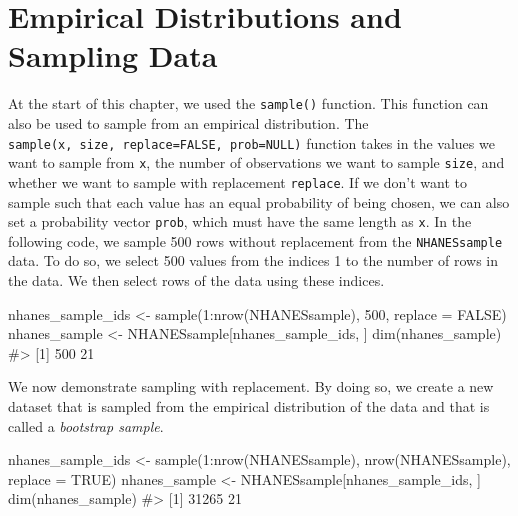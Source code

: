\documentclass[
  letterpaper,
]{latex/krantz}
\makeatletter
\newenvironment{Shaded}{\begin{snugshade}}{\end{snugshade}}
\newcommand{\AttributeTok}[1]{\textcolor[rgb]{0.40,0.45,0.13}{#1}}
\newcommand{\CommentTok}[1]{\textcolor[rgb]{0.37,0.37,0.37}{#1}}
\newcommand{\ConstantTok}[1]{\textcolor[rgb]{0.56,0.35,0.01}{#1}}
\newcommand{\DecValTok}[1]{\textcolor[rgb]{0.68,0.00,0.00}{#1}}
\newcommand{\FunctionTok}[1]{\textcolor[rgb]{0.28,0.35,0.67}{#1}}
\newcommand{\NormalTok}[1]{\textcolor[rgb]{0.00,0.23,0.31}{#1}}
\newcommand{\OtherTok}[1]{\textcolor[rgb]{0.00,0.23,0.31}{#1}}
\newcommand{\SpecialCharTok}[1]{\textcolor[rgb]{0.37,0.37,0.37}{#1}}
\newenvironment{kframe}{%
\medskip{}
\setlength{\fboxsep}{.8em}
 \def\at@end@of@kframe{}%
 \ifinner\ifhmode%
  \def\at@end@of@kframe{\end{minipage}}%
  \begin{minipage}{\columnwidth}%
 \fi\fi%
 \def\FrameCommand##1{\hskip\@totalleftmargin \hskip-\fboxsep
 \colorbox{shadecolor}{##1}\hskip-\fboxsep
     \hskip-\linewidth \hskip-\@totalleftmargin \hskip\columnwidth}%
 \MakeFramed {\advance\hsize-\width
   \@totalleftmargin\z@ \linewidth\hsize
   \@setminipage}}%
 {\par\unskip\endMakeFramed%
 \at@end@of@kframe}
\renewenvironment{Shaded}{\begin{kframe}}{\end{kframe}}
\makeatother
\begin{document}
\section{\texorpdfstring{Empirical Distributions and Sampling Data
}{Empirical Distributions and Sampling Data  }}\label{empirical-distributions-and-sampling-data}

At the start of this chapter, we used the \texttt{sample()} function.
This function can also be used to sample from an empirical distribution.
The \texttt{sample(x,\ size,\ replace=FALSE,\ prob=NULL)} function takes
in the values we want to sample from \texttt{x}, the number of
observations we want to sample \texttt{size}, and whether we want to
sample with replacement \texttt{replace}. If we don't want to sample
such that each value has an equal probability of being chosen, we can
also set a probability vector \texttt{prob}, which must have the same
length as \texttt{x}. In the following code, we sample 500 rows without
replacement from the \texttt{NHANESsample} data. To do so, we select 500
values from the indices 1 to the number of rows in the data. We then
select rows of the data using these indices.

\begin{Shaded}
\begin{Highlighting}[]
\NormalTok{nhanes\_sample\_ids }\OtherTok{\textless{}{-}} \FunctionTok{sample}\NormalTok{(}\DecValTok{1}\SpecialCharTok{:}\FunctionTok{nrow}\NormalTok{(NHANESsample), }\DecValTok{500}\NormalTok{, }\AttributeTok{replace =} \ConstantTok{FALSE}\NormalTok{)}
\NormalTok{nhanes\_sample }\OtherTok{\textless{}{-}}\NormalTok{ NHANESsample[nhanes\_sample\_ids, ]}
\FunctionTok{dim}\NormalTok{(nhanes\_sample)}
\CommentTok{\#\textgreater{} [1] 500  21}
\end{Highlighting}
\end{Shaded}

We now demonstrate sampling with replacement. By doing so, we create a
new dataset that is sampled from the empirical distribution of the data
and that is called a \emph{bootstrap sample}.

\begin{Shaded}
\begin{Highlighting}[]
\NormalTok{nhanes\_sample\_ids }\OtherTok{\textless{}{-}} \FunctionTok{sample}\NormalTok{(}\DecValTok{1}\SpecialCharTok{:}\FunctionTok{nrow}\NormalTok{(NHANESsample), }\FunctionTok{nrow}\NormalTok{(NHANESsample), }
                            \AttributeTok{replace =} \ConstantTok{TRUE}\NormalTok{)}
\NormalTok{nhanes\_sample }\OtherTok{\textless{}{-}}\NormalTok{ NHANESsample[nhanes\_sample\_ids, ]}
\FunctionTok{dim}\NormalTok{(nhanes\_sample)}
\CommentTok{\#\textgreater{} [1] 31265    21}
\end{Highlighting}
\end{Shaded}
\end{document}
